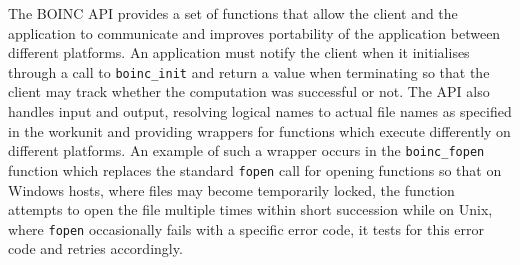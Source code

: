 The BOINC API provides a set of functions that   allow the client and the application to communicate and   improves portability of the application between different platforms.
An application must notify the client when it initialises through a call to \verb|boinc_init| and return a value when terminating so that the client may track whether the computation was successful or not. 
The API also handles input and output, resolving logical names to actual file names as specified in the workunit and providing wrappers for functions which execute differently on different platforms. An example of such a wrapper occurs in the  \verb|boinc_fopen| function which replaces the standard \texttt{fopen} call for opening functions so that on Windows hosts, where files may become temporarily locked, the function attempts to open the file multiple times within short succession while on Unix, where \texttt{fopen} occasionally fails with a specific error code, it tests for this error code and retries accordingly. 

